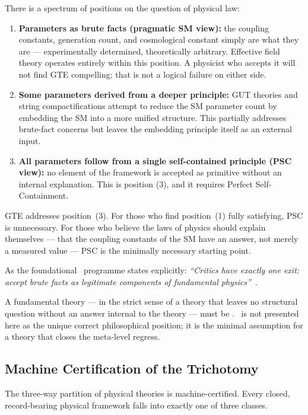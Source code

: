\documentclass[11pt,openany]{book}
\theoremstyle{remark}
\newcommand{\PSC}{\text{PSC}}
\newcommand{\NEMS}{\text{NEMS}}
\begin{document}
There is a spectrum of positions on the question of physical law:
\begin{enumerate}[leftmargin=1.8em, itemsep=3pt]
\item \textbf{Parameters as brute facts (pragmatic SM view):} the coupling constants,
  generation count, and cosmological constant simply are what they are --- experimentally
  determined, theoretically arbitrary.  Effective field theory operates entirely within
  this position.  A physicist who accepts it will not find GTE compelling; that is not
  a logical failure on either side.

\item \textbf{Some parameters derived from a deeper principle:} GUT theories and string
  compactifications attempt to reduce the SM parameter count by embedding the SM into
  a more unified structure.  This partially addresses brute-fact concerns but leaves
  the embedding principle itself as an external input.

\item \textbf{All parameters follow from a single self-contained principle (PSC view):}
  no element of the framework is accepted as primitive without an internal explanation.
  This is position (3), and it requires Perfect Self-Containment.
\end{enumerate}

GTE addresses position~(3).  For those who find position~(1) fully satisfying, PSC is
unnecessary.  For those who believe the laws of physics should explain themselves ---
that the coupling constants of the SM have an answer, not merely a measured value --- PSC
is the minimally necessary starting point.

As the foundational \NEMS\ programme states explicitly:
\textit{``Critics have exactly one exit: accept brute facts as legitimate components of
fundamental physics''}~\cite{SpivackNEMS05}.

A fundamental theory --- in the strict sense of a theory that leaves no structural
question without an answer internal to the theory --- must be \PSC.
\PSC\ is not presented here as the unique correct philosophical position; it is the
minimal assumption for a theory that closes the meta-level regress.

\subsection*{Machine Certification of the Trichotomy}

The three-way partition of physical theories is machine-certified. Every closed,
record-bearing physical framework falls into exactly one of three classes.
\end{document}
